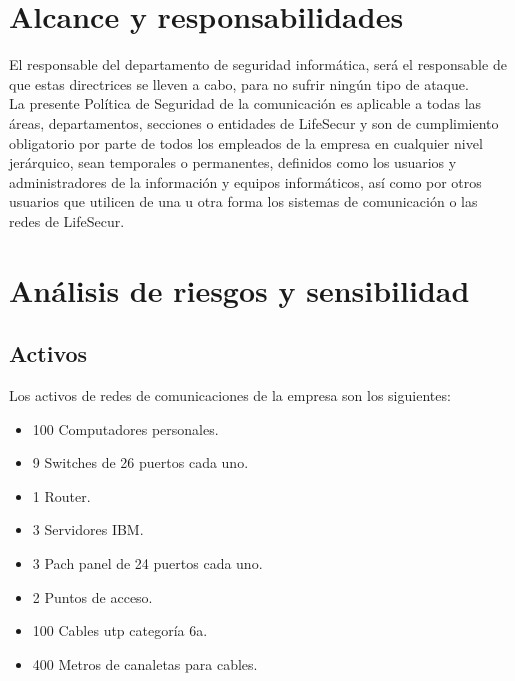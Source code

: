 \documentclass[11pt,bibtotoc,noliststotoc,BCOR0mm]{scrbook}
\begin{document}
\section{Alcance y responsabilidades}

El responsable del departamento de seguridad informática, será el responsable de que estas directrices se lleven a cabo, para no sufrir ningún tipo de ataque. \\
La presente Política de Seguridad de la comunicación es aplicable a todas las áreas, departamentos, secciones o entidades de LifeSecur y son de cumplimiento obligatorio por parte de todos los empleados de la empresa en cualquier nivel jerárquico, sean temporales o permanentes, definidos como los usuarios y administradores de la información y equipos informáticos, así como por otros usuarios que utilicen de una u otra forma los sistemas de comunicación o las redes de LifeSecur.\\

\section{Análisis de riesgos y sensibilidad}

\subsection{Activos}

Los activos de redes de comunicaciones de la empresa son los siguientes:

\begin{itemize}
\item 100 Computadores personales.
\item 9 Switches de 26 puertos cada uno.
\item 1 Router.
\item 3 Servidores IBM.
\item 3 Pach panel de 24 puertos cada uno.
\item 2 Puntos de acceso.
\item 100 Cables utp categoría 6a.
\item 400 Metros de canaletas para cables.
\end{itemize} 
\end{document}
